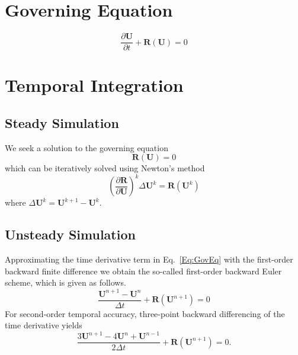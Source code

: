 \documentclass[a4paper]{article}
\begin{document}
\newcommand{\U}{\mathbf{U}}
\newcommand{\E}{\mathbf{E}}
\newcommand{\F}{\mathbf{F}}
\newcommand{\G}{\mathbf{G}}
\newcommand{\HH}{\mathbf{H}}
\newcommand{\I}{\mathbf{I}}
\newcommand{\w}{\mathbf{w}}
\newcommand{\R}{\mathbf{R}}
\newcommand{\Sn}{\mathbf{S}}



\section{Governing Equation}
\begin{equation}
\frac{\partial\U}{\partial t} + \R\left(\U\right) = 0
\label{Eq:GovEq}
\end{equation}



\section{Temporal Integration}

\subsection{Steady Simulation}
We seek a solution to the governing equation
\begin{equation}
\R\left(\U\right) = 0
\end{equation}
which can be iteratively solved using Newton's method
\begin{equation}
\left(\frac{\partial \R}{\partial\U}\right)^k
\Delta \U^k
=
\R\left(\U^k\right)
\end{equation}
where $\Delta\U^k = \U^{k + 1} - \U^k$.

\subsection{Unsteady Simulation}

Approximating the time derivative term in Eq.~\ref{Eq:GovEq} with the first-order backward finite difference we obtain the so-called first-order backward Euler scheme, which is given as follows.
\begin{equation}
\frac{\U^{n+1} - \U^n}{\Delta t} + \R\left(\U^{n+1}\right) = 0
\label{Eq:FirstOrderBackwardEuler}
\end{equation}
For second-order temporal accuracy, three-point backward differencing of the time derivative yields
\begin{equation}
\frac{3\U^{n+1} - 4\U^n + \U^{n-1}}{2\Delta t} + \R\left(\U^{n+1}\right) = 0.
\label{Eq:SecondOrderBackwardEuler}
\end{equation}
\end{document}
